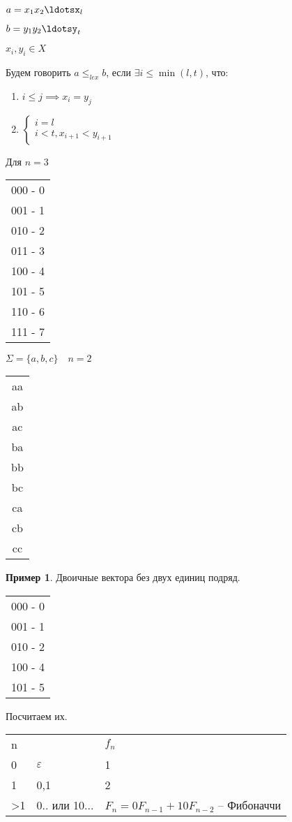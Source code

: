 \documentclass{book}
\theoremstyle{definition}
\newtheorem*{example}{Пример}
\begin{document}
$a = x_1x_2\ldotsx_{l}$

$b = y_1y_2\ldotsy_t$

$x_{i}, y_{i} \in X$

Будем говорить $a\leqslant _{lex} b$, если $\exists i\leqslant \min(l, t)$, что:
 \begin{enumerate}
    \item $i\leqslant j \implies  x_{i}  = y_{j} $
    \item  $\begin{cases}
        i = l\\
        i<t, x_{i+1}<y_{i+1}
    \end{cases}$
\end{enumerate}

Для $n=3$
\begin{tabular}{c}
000 - 0\\001 - 1\\010 - 2\\011 - 3\\100 - 4 \\101 - 5\\110 - 6\\111 - 7\\
\end{tabular}

$\Sigma = \{a,b,c\}\quad n = 2$
\begin{tabular}{c}
    aa\\ab\\ac\\ba\\bb\\bc\\ca\\cb\\cc\\
\end{tabular}

\begin{example}
    Двоичные вектора без двух единиц подряд.
\begin{tabular}{c}
000 - 0\\001 - 1\\010 - 2\\100 - 4 \\101 - 5
\end{tabular}

Посчитаем их. 

\begin{tabular}{lll}
    n & & $f_n$\\
    0&$\varepsilon$&1\\
    1&0,1&2\\
    >1&0.. или 10...&$F_n = 0F_{n-1} + 10F_{n-2}$ -- Фибоначчи\\
\end{tabular}
\end{example}
\end{document}
